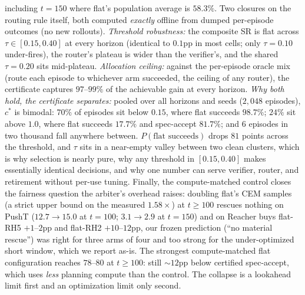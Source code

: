 \documentclass{article}
\begin{document}
including $t{=}150$ where flat's population average is $58.3\%$. Two closures on the
routing rule itself, both computed \emph{exactly} offline from dumped per-episode
outcomes (no new rollouts). \emph{Threshold robustness:} the composite SR is flat
across $\tau\in[0.15,0.40]$ at every horizon (identical to $0.1$pp in most cells;
only $\tau{=}0.10$ under-fires), the router's plateau is wider than the
verifier's, and the shared $\tau{=}0.20$ sits mid-plateau. \emph{Allocation
ceiling:} against the per-episode oracle mix (route each episode to whichever arm
succeeded, the ceiling of any router), the certificate captures $97$--$99\%$ of
the achievable gain at every horizon. \emph{Why both hold, the certificate
separates:} pooled over all horizons and seeds ($2{,}048$ episodes), $c^{*}$ is
bimodal: $70\%$ of episodes sit below $0.15$, where flat succeeds $98.7\%$;
$24\%$ sit above $1.0$, where flat succeeds $17.7\%$ and spec-accept $81.7\%$; and
$6$ episodes in two thousand fall anywhere between. $P(\text{flat succeeds})$ drops
$81$ points across the threshold, and $\tau$ sits in a near-empty valley between
two clean clusters, which is why selection is nearly pure, why any threshold in
$[0.15,0.40]$ makes essentially identical decisions, and why one number can serve
verifier, router, and retirement without per-use tuning.
Finally, the compute-matched control closes the fairness question the arbiter's
overhead raises: doubling flat's CEM samples (a strict upper bound on the measured
$1.58\times$) at $t{\ge}100$ rescues nothing on PushT ($12.7{\to}15.0$ at $t{=}100$;
$3.1{\to}2.9$ at $t{=}150$) and on Reacher buys flat-RH5 $+1$--$2$pp and flat-RH2
$+10$--$12$pp, our frozen prediction (``no material rescue'') was right for three
arms of four and too strong for the under-optimized short window, which we report
as-is. The strongest compute-matched flat configuration reaches $78$--$80$ at
$t{\ge}100$: still ${\sim}12$pp below certified spec-accept, which uses \emph{less}
planning compute than the control. The collapse is a lookahead limit first and an
optimization limit only second.
\end{document}
